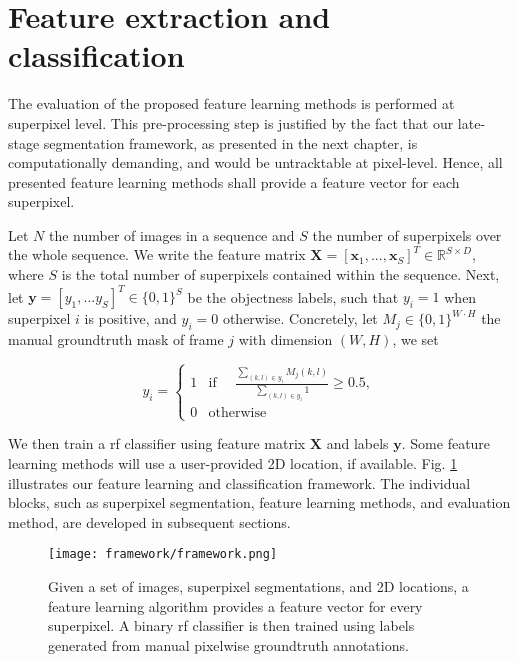 \section{Feature extraction and classification} \label{framework}
The evaluation of the proposed feature learning methods is performed at superpixel level.
This pre-processing step is justified by the fact that our late-stage segmentation
framework, as presented in the next chapter, is computationally demanding, and would be untracktable at pixel-level.
Hence, all presented feature learning methods shall provide a feature vector for each superpixel.

Let $N$ the number of images in a sequence and $S$ the number of superpixels over the whole sequence.
We write the feature matrix $\boldsymbol{X} = [\boldsymbol{x}_1,...,\boldsymbol{x}_S]^T \in \mathbb{R}^{S \times D}$, where $S$ is the total number of superpixels contained within the sequence.
Next, let $\boldsymbol{y} = [y_1,...y_S]^T \in \{0,1\}^S$ be the objectness labels, such that $y_i=1$ when superpixel $i$ is positive, and $y_i=0$ otherwise.
Concretely, let $M_{j} \in \{0,1\}^{W \cdot H}$ the manual groundtruth mask of frame $j$ with dimension $(W,H)$, we set

\begin{equation}
y_{i} =
\begin{cases}
      1 & \text{if $\quad \frac{\sum_{(k,l) \in y_{i}} M_{j}(k,l)}{\sum_{(k,l) \in y_{i}}1} \geq 0.5$}, \\
      0 & \text{otherwise}
   \end{cases}
\end{equation}

We then train a \gls{rf} classifier using feature matrix $\boldsymbol{X}$ and labels $\boldsymbol{y}$.
Some feature learning methods will use a user-provided 2D location, if available.
Fig. \ref{fig:Framework} illustrates our feature learning and classification framework.
The individual blocks, such as superpixel segmentation, feature learning methods, and evaluation method, are developed in subsequent sections.

\begin{figure}[!htpb]
  \centering
  \texttt{[image: framework/framework.png]}
  \caption[Framework description]{Given a set of images, superpixel segmentations, and 2D locations, a feature learning algorithm provides a feature vector for every superpixel.
    A binary \gls{rf} classifier is then trained using labels generated from manual pixelwise groundtruth annotations.}
  \label{fig:Framework}
\end{figure}

